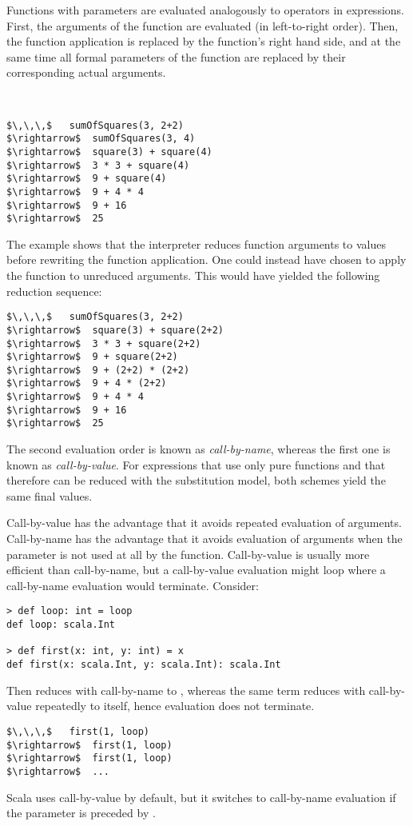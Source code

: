 Functions with parameters are evaluated analogously to operators in
expressions. First, the arguments of the function are evaluated (in
left-to-right order). Then, the function application is replaced by
the function's right hand side, and at the same time all formal
parameters of the function are replaced by their corresponding actual
arguments.

\example\ 
 
\begin{lstlisting}
$\,\,\,$   sumOfSquares(3, 2+2)
$\rightarrow$  sumOfSquares(3, 4)
$\rightarrow$  square(3) + square(4)
$\rightarrow$  3 * 3 + square(4)
$\rightarrow$  9 + square(4)
$\rightarrow$  9 + 4 * 4
$\rightarrow$  9 + 16
$\rightarrow$  25
\end{lstlisting}

The example shows that the interpreter reduces function arguments to
values before rewriting the function application.  One could instead
have chosen to apply the function to unreduced arguments. This would
have yielded the following reduction sequence:
\begin{lstlisting}
$\,\,\,$   sumOfSquares(3, 2+2)
$\rightarrow$  square(3) + square(2+2)
$\rightarrow$  3 * 3 + square(2+2)
$\rightarrow$  9 + square(2+2)
$\rightarrow$  9 + (2+2) * (2+2)
$\rightarrow$  9 + 4 * (2+2)
$\rightarrow$  9 + 4 * 4
$\rightarrow$  9 + 16
$\rightarrow$  25
\end{lstlisting}

The second evaluation order is known as \emph{call-by-name},
whereas the first one is known as \emph{call-by-value}.  For
expressions that use only pure functions and that therefore can be
reduced with the substitution model, both schemes yield the same final
values.  

Call-by-value has the advantage that it avoids repeated evaluation of
arguments. Call-by-name has the advantage that it avoids evaluation of
arguments when the parameter is not used at all by the function.
Call-by-value is usually more efficient than call-by-name, but a
call-by-value evaluation might loop where a call-by-name evaluation
would terminate. Consider:
\begin{lstlisting}
> def loop: int = loop
def loop: scala.Int

> def first(x: int, y: int) = x
def first(x: scala.Int, y: scala.Int): scala.Int
\end{lstlisting}
Then  reduces with call-by-name to ,
whereas the same term reduces with call-by-value repeatedly to itself,
hence evaluation does not terminate.
\begin{lstlisting}
$\,\,\,$   first(1, loop)
$\rightarrow$  first(1, loop)
$\rightarrow$  first(1, loop)
$\rightarrow$  ...
\end{lstlisting}
Scala uses call-by-value by default, but it switches to call-by-name evaluation
if the parameter is preceded by .

